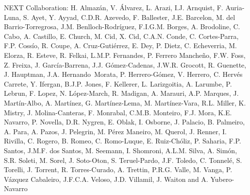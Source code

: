NEXT Collaboration: H. Almaz\'an, V. \'Alvarez, L. Arazi, I.J. Arnquist, F. Auria-Luna, S. Ayet, Y. Ayyad, C.D.R. Azevedo, F. Ballester, J.E. Barcelon, M. del Barrio-Torregrosa, J.M. Benlloch-Rodr\'{i}guez, F.I.G.M. Borges, A. Brodoline, C. Cabo, A. Castillo, E. Church, M. Cid, X. Cid, C.A.N. Conde, C. Cortes-Parra, F.P. Coss\'io, R. Coupe, A. Cruz-Gutiérrez, E. Dey, P. Dietz, C. Echeverria, M. Elorza, R. Esteve, R. Felkai, L.M.P. Fernandes, P. Ferrero Manche\~{n}o, F.W. Foss, Z. Freixa, J. Garc\'ia-Barrena, J.J. G\'omez-Cadenas, J.W.R. Grocott, R. Guenette, J. Hauptman, J.A. Hernando~Morata, P. Herrero-G\'omez, V. Herrero, C. Herv\'es Carrete, Y. Ifergan, B.J.P. Jones, F. Kellerer, L. Larizgoitia, A. Larumbe, P. Lebrun, F. Lopez, N. L\'opez-March, R. Madigan, A. Marauri, A.P. Marques, J. Mart\'in-Albo, A. Mart\'inez, G. Mart\'inez-Lema, M. Mart\'inez-Vara, R.L. Miller, K. Mistry, J. Molina-Canteras, F. Monrabal, C.M.B. Monteiro, F.J. Mora, K.E. Navarro, P. Novella, D.R. Nygren, E. Oblak, I. Osborne, J. Palacio, B. Palmeiro, A. Para, A. Pazos, J. Pelegrin, M. P\'erez Maneiro, M. Querol, J. Renner, I. Rivilla, C. Rogero, B. Romeo, C. Romo-Luque, E. Ruiz-Ch\'oliz, P. Saharia, F.P. Santos, J.M.F. dos Santos, M. Seemann, I. Shomroni, A.L.M. Silva, A. Sim\'on, S.R. Soleti, M. Sorel, J. Soto-Oton, S. Teruel-Pardo, J.F. Toledo, C. Tonnel\'e, S. Torelli, J. Torrent, R. Torres-Curado, A. Trettin, P.R.G. Valle, M. Vanga, P. V\'azquez Cabaleiro, J.F.C.A. Veloso, J.D. Villamil, J. Waiton and A. Yubero-Navarro